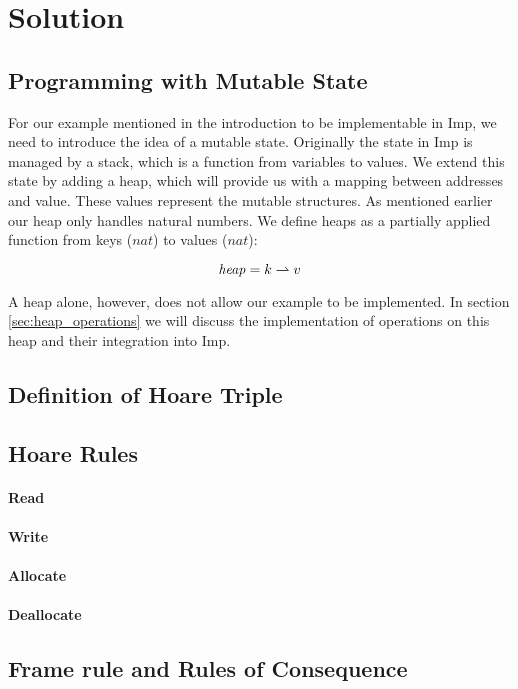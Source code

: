 \section{Solution}
\subsection{Programming with Mutable State}
\label{sec:programming_with_mutable_state}
For our example mentioned in the introduction to be implementable in Imp, we need to introduce the idea of a mutable state. Originally the state in Imp is managed by a stack, which is a function from variables to values. We extend this state by adding a heap, which will provide us with a mapping between addresses and value. These values represent the mutable structures. As mentioned earlier our heap only handles natural numbers. We define heaps as a partially applied function from keys ($nat$) to values ($nat$):

\[
\mathit{heap} = k\rightharpoonup v
\] 

A heap alone, however, does not allow our example to be implemented. In section \ref{sec:heap_operations} we will discuss the implementation of operations on this heap and their integration into Imp.



\subsection{Definition of Hoare Triple}

\subsection{Hoare Rules}
\label{sec:hoare_rules}
\paragraph{Read}
\paragraph{Write}
\paragraph{Allocate}
\paragraph{Deallocate}
\subsection{Frame rule and Rules of Consequence}

